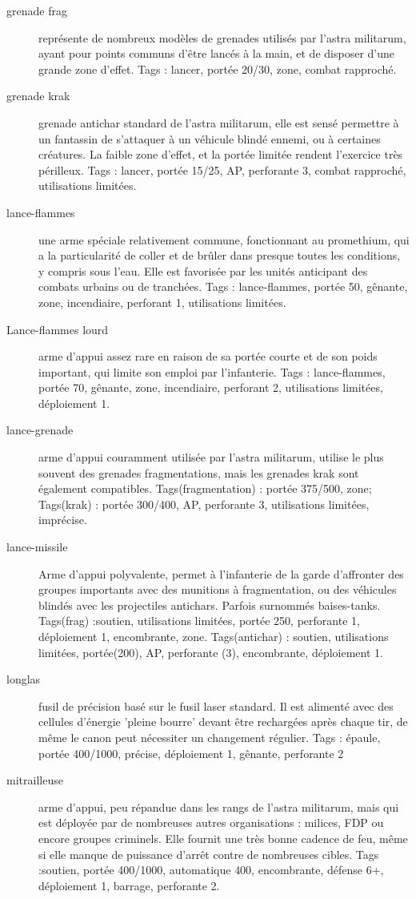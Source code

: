 \documentclass[10pt,a4paper]{article}
\begin{document}
\begin{description}
\item[grenade frag]représente de nombreux modèles de grenades utilisés par l'astra militarum, ayant pour points communs d'être lancés à la main, et de disposer d'une grande zone d'effet. Tags : lancer, portée 20/30, zone, combat rapproché.
\item[grenade krak ]grenade antichar standard de l'astra militarum, elle est sensé permettre à un fantassin de s'attaquer à un véhicule blindé ennemi, ou à certaines créatures. La faible zone d'effet, et la portée limitée rendent l'exercice très périlleux. Tags : lancer, portée 15/25, AP, perforante 3, combat rapproché, utilisations limitées.
\item[lance-flammes]une arme spéciale relativement commune, fonctionnant au promethium, qui a la particularité de coller et de brûler dans presque toutes les conditions, y compris sous l'eau. Elle est favorisée par les unités anticipant des combats urbains ou de tranchées. Tags : lance-flammes, portée 50, gênante, zone, incendiaire, perforant 1, utilisations limitées.
\item[Lance-flammes lourd] arme d'appui assez rare en raison de sa portée courte et de son poids important, qui limite son emploi par l'infanterie. Tags : lance-flammes, portée 70, gênante, zone, incendiaire, perforant 2, utilisations limitées, déploiement 1.
\item[lance-grenade]arme d'appui couramment utilisée par l'astra militarum, utilise le plus souvent des grenades  fragmentations, mais les grenades krak sont également compatibles. Tags(fragmentation) : portée 375/500, zone; Tags(krak) : portée 300/400, AP, perforante 3, utilisations limitées, imprécise.
\item[lance-missile]Arme d'appui polyvalente, permet à l'infanterie de la garde d'affronter des groupes importants avec des munitions à fragmentation, ou des véhicules blindés avec les projectiles antichars. Parfois surnommés baises-tanks. Tags(frag) :soutien, utilisations limitées, portée 250, perforante 1, déploiement 1, encombrante, zone. Tags(antichar) : soutien, utilisations limitées, portée(200), AP, perforante (3), encombrante, déploiement 1.
\item[longlas ] fusil de précision basé sur le fusil laser standard. Il est alimenté avec des cellules d'énergie 'pleine bourre' devant être rechargées après chaque tir, de même le canon peut nécessiter un changement régulier. Tags : épaule, portée 400/1000, précise, déploiement 1, gênante, perforante 2
\item[mitrailleuse ]arme d'appui, peu répandue dans les rangs de l'astra militarum, mais qui est déployée par de nombreuses autres organisations : milices, FDP ou encore groupes criminels. Elle fournit une très bonne cadence de feu, même si elle manque de puissance d'arrêt contre de nombreuses cibles. Tags :soutien, portée 400/1000, automatique 400, encombrante, défense 6+, déploiement 1, barrage, perforante 2.

\end{description}
\end{document}
